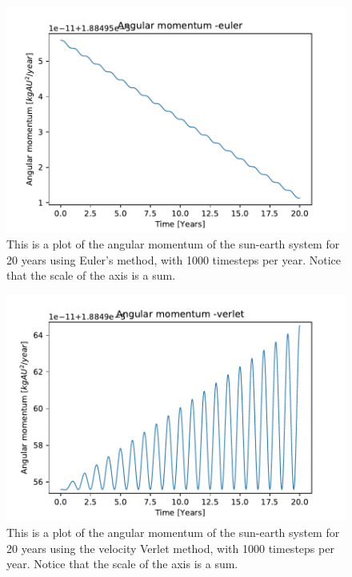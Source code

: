 \begin{figure}[H]
\includegraphics[width=0.9\linewidth]{../results/plots/angularmomentum-euler.pdf}\caption{This is a plot of the angular momentum of the sun-earth system for 20 years using Euler's method, with 1000 timesteps per year. Notice that the scale of the axis is a sum.}\label{fig:angluarmomentum-euler}
\end{figure}	

\begin{figure}[H]
\includegraphics[width=0.9\linewidth]{../results/plots/angularmomentum-verlet.pdf}\caption{This is a plot of the angular momentum of the sun-earth system for 20 years using the velocity Verlet method, with 1000 timesteps per year. Notice that the scale of the axis is a sum.}\label{fig:angularmomentum-verlet}
\end{figure}	

